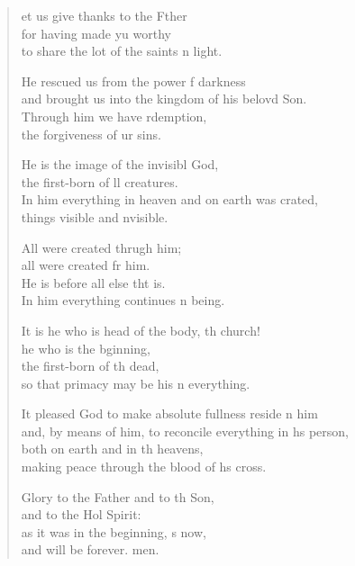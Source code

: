 \settowidth{\versewidth}{and, by means of him, to reconcile everything in his person,}
\begin{verse}%
  \begin{patverse}
et us give thanks to the Fther\Flex\\
for having made yu worthy\Med\\
to share the lot of the saints \pointup{\i}n light.

He rescued us from the power f darkness\Med\\
and brought us into the kingdom of his belovd Son.\\
Through him we have rdemption,\Med\\
the forgiveness of ur sins.

He is the image of the invisibl God,\Med\\
the first-born of ll creatures.\\
In him everything in heaven and on earth was crated,\Med\\
things visible and \pointup{\i}nvisible.

All were created thrugh him;\Med\\
all were created fr him.\\
He is before all else tht is.\Med\\
In him everything continues \pointup{\i}n being.

It is he who is head of the body, th church!\Med\\
he who is the bginning,\\
the first-born of th dead,\Med\\
so that primacy may be his \pointup{\i}n everything.

It pleased God to make absolute fullness reside \pointup{\i}n him\Med\\
and, by means of him, to reconcile everything in h\pointup{\i}s person,\\
both on earth and in th heavens,\Med\\
making peace through the blood of h\pointup{\i}s cross.

Glory to the Father and to th Son,\Med\\
and to the Hol Spirit:\\
as it was in the beginning, \pointup{\i}s now,\Med\\
and will be forever. men. 
  \end{patverse}
\end{verse}
